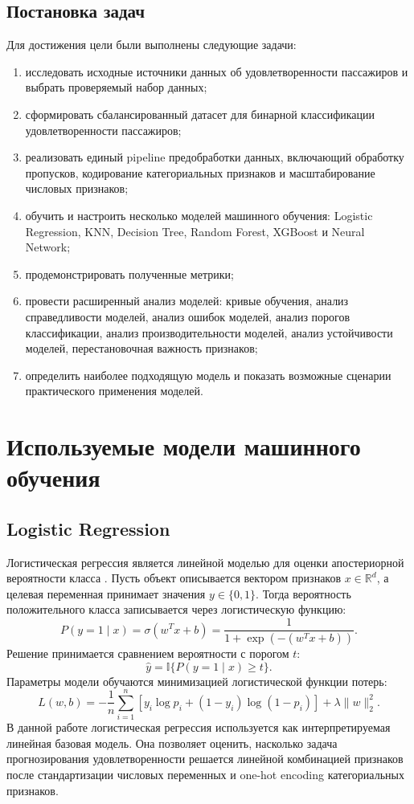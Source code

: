 \documentclass[14pt,a4paper]{extreport}
\begin{document}
\section{Постановка задач}
Для достижения цели были выполнены  следующие задачи:
\begin{enumerate}
    \item исследовать исходные источники данных об удовлетворенности пассажиров и выбрать проверяемый набор данных;
    \item сформировать сбалансированный датасет для бинарной классификации удовлетворенности пассажиров;
    \item реализовать единый pipeline предобработки данных, включающий обработку пропусков, кодирование категориальных признаков и масштабирование числовых признаков;
    \item обучить и настроить несколько моделей машинного обучения: Logistic Regression, KNN, Decision Tree, Random Forest, XGBoost и Neural Network;
    \item продемонстрировать полученные метрики;
    \item провести расширенный анализ моделей: кривые обучения, анализ справедливости моделей, анализ ошибок моделей, анализ порогов классификации, анализ производительности моделей, анализ устойчивости моделей, перестановочная важность признаков;
    \item определить наиболее подходящую модель и показать возможные сценарии практического применения моделей.
\end{enumerate}

\chapter{Используемые модели машинного обучения}
\section{Logistic Regression}
Логистическая регрессия является линейной моделью для оценки апостериорной вероятности класса \cite{hastie}. Пусть объект описывается вектором признаков $x \in \mathbb{R}^{d}$, а целевая переменная принимает значения $y \in \{0,1\}$. Тогда вероятность положительного класса записывается через логистическую функцию:
\begin{equation}
P(y=1 \mid x)=\sigma(w^{T}x+b)=\frac{1}{1+\exp(-(w^{T}x+b))}.
\end{equation}
Решение принимается сравнением вероятности с порогом $t$:
\begin{equation}
\hat{y}=\mathbb{I}\{P(y=1\mid x)\geq t\}.
\end{equation}
Параметры модели обучаются минимизацией логистической функции потерь:
\begin{equation}
L(w,b)=-\frac{1}{n}\sum_{i=1}^{n}\left[y_i\log p_i+(1-y_i)\log(1-p_i)\right]+\lambda\|w\|_2^2.
\end{equation}
В данной работе логистическая регрессия используется как интерпретируемая линейная базовая модель. Она позволяет оценить, насколько задача прогнозирования удовлетворенности решается линейной комбинацией признаков после стандартизации числовых переменных и one-hot encoding категориальных признаков.
\end{document}
